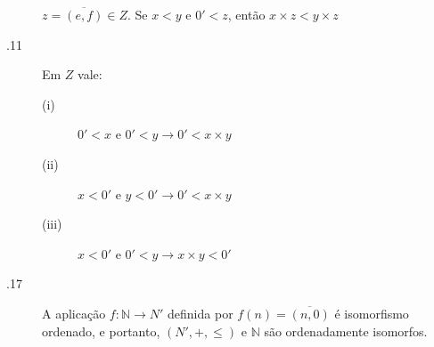 \documentclass[11pt]{article}
\newcommand{\N}{\mathbb{N}}
\begin{document}
\begin{description}
      $z=\overline{(e,f)} \in Z$. Se $x<y$ e $0'<z$, então $x\times z < y
      \times z$
    \item[\teor 3.1.11] Em $Z$ vale:
      \begin{description}
        \item[(i)] $0'<x$ e $0'<y \to 0' < x\times y$
        \item[(ii)] $x<0'$ e $y<0' \to 0' < x\times y$
        \item[(iii)] $x<0'$ e $0'<y \to x\times y < 0'$
      \end{description}
    \item[\teor 3.1.17] A aplicação $f:\N \to N'$ definida por $f(n) =
      \overline{(n, 0)}$ é isomorfismo ordenado, e portanto, $(N', +, \leq)$ e
      $\N$ são ordenadamente isomorfos.
\end{description}

\end{document}
